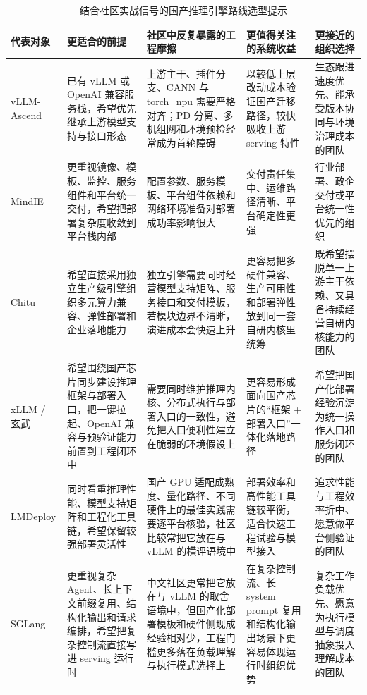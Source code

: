 \begin{table}[t]
\centering
\footnotesize
\setlength{\tabcolsep}{4pt}
\caption{结合社区实战信号的国产推理引擎路线选型提示}
\label{tab:community-route-selection}
\begin{tabularx}{\textwidth}{>{\raggedright\arraybackslash}p{2.0cm}p{2.2cm}p{3.6cm}p{3.6cm}X}
\toprule
代表对象 & 更适合的前提 & 社区中反复暴露的工程摩擦 & 更值得关注的系统收益 & 更接近的组织选择 \\
\midrule
vLLM-Ascend & 已有 vLLM 或 OpenAI 兼容服务栈，希望优先继承上游模型支持与接口形态 & 上游主干、插件分支、CANN 与 torch\_npu 需要严格对齐；PD 分离、多机组网和环境预检经常成为首轮障碍\citep{zhihu_vllm_ascend_guide,zhihu_vllm_pd_migration,xhs_search_vllm_ascend} & 以较低上层改动成本验证国产迁移路径，较快吸收上游 serving 特性 & 生态跟进速度优先、能承受版本协同与环境治理成本的团队 \\
MindIE & 更重视镜像、模板、监控、服务组件和平台统一交付，希望把部署复杂度收敛到平台栈内部 & 配置参数、服务模板、平台组件依赖和网络环境准备对部署成功率影响很大\citep{zhihu_mindie_deploy,xhs_search_mindie} & 交付责任集中、运维路径清晰、平台确定性更强 & 行业部署、政企交付或平台统一性优先的组织 \\
Chitu & 希望直接采用独立生产级引擎组织多元算力兼容、弹性部署和企业落地能力\citep{chitu_tsinghua_news,chitu_qingcheng,chitu_github} & 独立引擎需要同时经营模型支持矩阵、服务接口和交付模板，若模块边界不清晰，演进成本会快速上升 & 更容易把多硬件兼容、生产可用性和部署弹性放到同一套自研内核里统筹 & 既希望摆脱单一上游主干依赖、又具备持续经营自研内核能力的团队 \\
xLLM / 玄武 & 希望围绕国产芯片同步建设推理框架与部署入口，把一键拉起、OpenAI 兼容与预验证能力前置到工程闭环中\citep{xllm_docs,xuanwu_tsingmao} & 需要同时维护推理内核、分布式执行与部署入口的一致性，避免把入口便利性建立在脆弱的环境假设上 & 更容易形成面向国产芯片的“框架 + 部署入口”一体化落地路径 & 希望把国产化部署经验沉淀为统一操作入口和服务闭环的团队 \\
LMDeploy & 同时看重推理性能、模型支持矩阵和工程化工具链，希望保留较强部署灵活性 & 国产 GPU 适配成熟度、量化路径、不同硬件上的最佳实践需要逐平台核验，社区比较常把它放在与 vLLM 的横评语境中\citep{zhihu_lmdeploy_domestic,xhs_search_lmdeploy} & 部署效率和高性能工具链较平衡，适合快速工程试验与模型接入 & 追求性能与工程效率折中、愿意做平台侧验证的团队 \\
SGLang & 更重视复杂 Agent、长上下文前缀复用、结构化输出和请求编排，希望把复杂控制流直接写进 serving 运行时 & 中文社区更常把它放在与 vLLM 的取舍语境中，但国产化部署模板和硬件侧现成经验相对少，工程门槛更多落在负载理解与执行模式选择上\citep{zhihu_vllm_sglang_llamacpp_compare,xhs_search_sglang_deploy} & 在复杂控制流、长 system prompt 复用和结构化输出场景下更容易体现运行时组织优势 & 复杂工作负载优先、愿意为执行模型与调度抽象投入理解成本的团队 \\

\end{tabularx}
\end{table}
